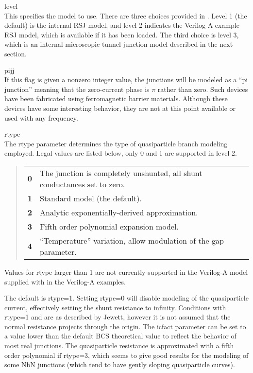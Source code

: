 \begin{description}
\item{\vt level}\\
This specifies the model to use.  There are three choices provided in
{\WRspice}.  Level 1 (the default) is the internal RSJ model, and
level 2 indicates the Verilog-A example RSJ model, which is available
if it has been loaded.  The third choice is level 3, which is an
internal microscopic tunnel junction model described in the next
section.

\item{\vt pijj}\\
If this flag is given a nonzero integer value, the junctions will be
modeled as a ``pi junction'' meaning that the zero-current phase is
$\pi$ rather than zero.  Such devices have been fabricated using
ferromagnetic barrier materials.  Although these devices have some
interesting behavior, they are not at this point available or used
with any frequency.

\item{\vt rtype}\\
The {\vt rtype} parameter determines the type of quasiparticle branch
modeling employed.  Legal values are listed below, only 0 and 1 are
supported in level 2.
\begin{quote}
\begin{tabular}{ll}
\bf 0 & The junction is completely unshunted, all shunt conductances
 set to zero.\\
\bf 1 & Standard model (the default).\\
\bf 2 & Analytic exponentially-derived approximation.\\
\bf 3 & Fifth order polynomial expansion model.\\
\bf 4 & ``Temperature'' variation, allow modulation of the gap parameter.\\
\end{tabular}
\end{quote}

Values for {\vt rtype} larger than 1 are not currently supported in
the Verilog-A model supplied with {\WRspice} in the Verilog-A
examples.

The default is {\vt rtype=1}.  Setting {\vt rtype=0} will disable
modeling of the quasiparticle current, effectively setting the shunt
resistance to infinity.  Conditions with {\vt rtype=1} and {} are
as described by Jewett, however it is not assumed that the normal
resistance projects through the origin.  The {\vt icfact} parameter
can be set to a value lower than the default BCS theoretical value to
reflect the behavior of most real junctions.  The quasiparticle
resistance is approximated with a fifth order polynomial if {\vt
rtype=3}, which seems to give good results for the modeling of some
NbN junctions (which tend to have gently sloping quasiparticle
curves).


\end{description}
